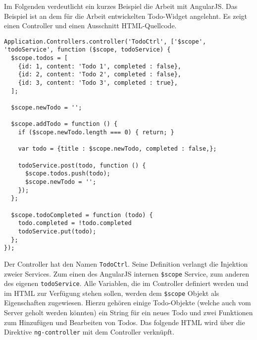 Im Folgenden verdeutlicht ein kurzes Beispiel die Arbeit mit AngularJS. Das Beispiel ist an dem für die Arbeit entwickelten Todo-Widget angelehnt. Es zeigt einen Controller und einen Ausschnitt HTML-Quellcode.

\begin{lstlisting}
Application.Controllers.controller('TodoCtrl', ['$scope', 'todoService', function ($scope, todoService) {
  $scope.todos = [
    {id: 1, content: 'Todo 1', completed : false},
    {id: 2, content: 'Todo 2', completed : false},
    {id: 3, content: 'Todo 3', completed : true},
  ];
  
  $scope.newTodo = '';

  $scope.addTodo = function () {
    if ($scope.newTodo.length === 0) { return; }

    var todo = {title : $scope.newTodo, completed : false,};

    todoService.post(todo, function () {
      $scope.todos.push(todo);
      $scope.newTodo = '';
    });
  };
  
  $scope.todoCompleted = function (todo) {
    todo.completed = !todo.completed
    todoService.put(todo);
  };
});
\end{lstlisting}
Der Controller hat den Namen \texttt{TodoCtrl}. Seine Definition verlangt die Injektion zweier Services. Zum einen des AngularJS internen \texttt{\$scope} Service, zum anderen des eigenen \texttt{todoService}. Alle Variablen, die im Controller definiert werden und im HTML zur Verfügung stehen sollen, werden dem \texttt{\$scope} Objekt als Eigenschaften zugewiesen. Hierzu gehören einige Todo-Objekte (welche auch vom Server geholt werden könnten) ein String für ein neues Todo und zwei Funktionen zum Hinzufügen und Bearbeiten von Todos. Das folgende HTML wird über die Direktive \texttt{ng-controller} mit dem Controller verknüpft.

